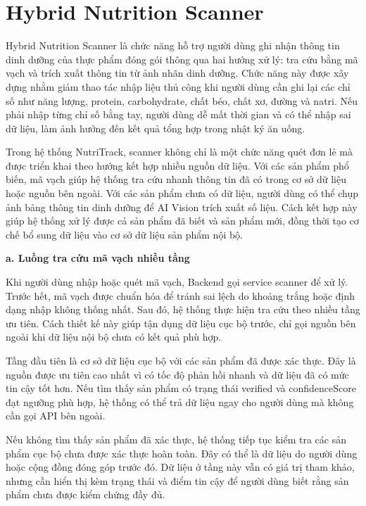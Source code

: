 \documentclass[12pt, a4paper]{report}
\begin{document}
\section{Hybrid Nutrition Scanner}Hybrid Nutrition Scanner là chức năng hỗ trợ người dùng ghi nhận thông tin dinh dưỡng của thực phẩm đóng gói thông qua hai hướng xử lý: tra cứu bằng mã vạch và trích xuất thông tin từ ảnh nhãn dinh dưỡng. Chức năng này được xây dựng nhằm giảm thao tác nhập liệu thủ công khi người dùng cần ghi lại các chỉ số như năng lượng, protein, carbohydrate, chất béo, chất xơ, đường và natri. Nếu phải nhập từng chỉ số bằng tay, người dùng dễ mất thời gian và có thể nhập sai dữ liệu, làm ảnh hưởng đến kết quả tổng hợp trong nhật ký ăn uống.

Trong hệ thống NutriTrack, scanner không chỉ là một chức năng quét đơn lẻ mà được triển khai theo hướng kết hợp nhiều nguồn dữ liệu. Với các sản phẩm phổ biến, mã vạch giúp hệ thống tra cứu nhanh thông tin đã có trong cơ sở dữ liệu hoặc nguồn bên ngoài. Với các sản phẩm chưa có dữ liệu, người dùng có thể chụp ảnh bảng thông tin dinh dưỡng để AI Vision trích xuất số liệu. Cách kết hợp này giúp hệ thống xử lý được cả sản phẩm đã biết và sản phẩm mới, đồng thời tạo cơ chế bổ sung dữ liệu vào cơ sở dữ liệu sản phẩm nội bộ.

\textbf{a. Luồng tra cứu mã vạch nhiều tầng}

Khi người dùng nhập hoặc quét mã vạch, Backend gọi service scanner để xử lý. Trước hết, mã vạch được chuẩn hóa để tránh sai lệch do khoảng trắng hoặc định dạng nhập không thống nhất. Sau đó, hệ thống thực hiện tra cứu theo nhiều tầng ưu tiên. Cách thiết kế này giúp tận dụng dữ liệu cục bộ trước, chỉ gọi nguồn bên ngoài khi dữ liệu nội bộ chưa có kết quả phù hợp.

Tầng đầu tiên là cơ sở dữ liệu cục bộ với các sản phẩm đã được xác thực. Đây là nguồn được ưu tiên cao nhất vì có tốc độ phản hồi nhanh và dữ liệu đã có mức tin cậy tốt hơn. Nếu tìm thấy sản phẩm có trạng thái verified và confidenceScore đạt ngưỡng phù hợp, hệ thống có thể trả dữ liệu ngay cho người dùng mà không cần gọi API bên ngoài.

Nếu không tìm thấy sản phẩm đã xác thực, hệ thống tiếp tục kiểm tra các sản phẩm cục bộ chưa được xác thực hoàn toàn. Đây có thể là dữ liệu do người dùng hoặc cộng đồng đóng góp trước đó. Dữ liệu ở tầng này vẫn có giá trị tham khảo, nhưng cần hiển thị kèm trạng thái và điểm tin cậy để người dùng biết rằng sản phẩm chưa được kiểm chứng đầy đủ.
\end{document}
